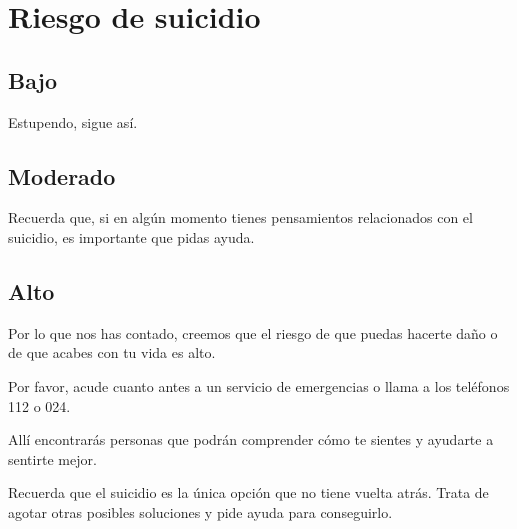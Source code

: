     \section{Riesgo de suicidio}
        \subsection{Bajo}
            Estupendo, sigue así. 
        \subsection{Moderado}
            Recuerda que, si en algún momento tienes pensamientos relacionados con el suicidio, es importante que pidas ayuda.

        \subsection{Alto}
            Por lo que nos has contado, creemos que el riesgo de que puedas hacerte daño o de que acabes con tu vida es alto.

            Por favor, acude cuanto antes a un servicio de emergencias o llama a los teléfonos 112 o 024. 
            
            Allí encontrarás personas que podrán comprender cómo te sientes y ayudarte a sentirte mejor. 
            
            Recuerda que el suicidio es la única opción que no tiene vuelta atrás. Trata de agotar otras posibles soluciones y pide ayuda para conseguirlo.